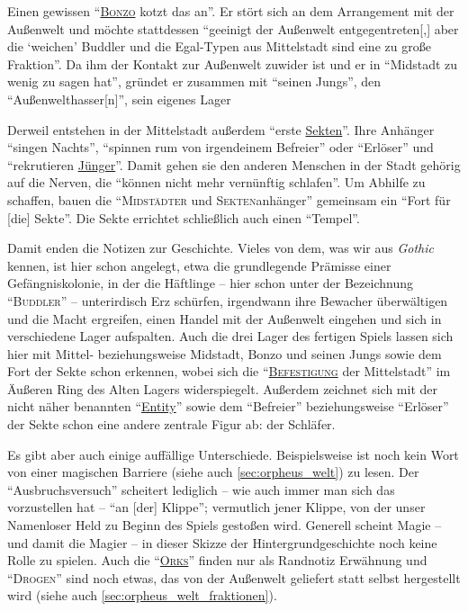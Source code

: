 \documentclass[a5paper,pagesize,numbers=noenddot]{scrbook}
\begin{document}
Einen gewissen \enquote{\textsc{\uline{Bonzo}} kotzt das an}.
Er stört sich an dem Arrangement mit der Außenwelt und möchte stattdessen \enquote{geeinigt der Außenwelt entgegentreten[,] aber die \enquote{weichen} Buddler und die Egal-Typen aus Mittelstadt sind eine zu große Fraktion}.
Da ihm der Kontakt zur Außenwelt zuwider ist und er in \enquote{Midstadt zu wenig zu sagen hat}, gründet er zusammen mit \enquote{seinen Jungs}, den \enquote{Außenwelthasser[n]}, sein eigenes Lager

Derweil entstehen in der Mittelstadt außerdem \enquote{erste \uline{Sekten}}.
Ihre Anhänger \enquote{singen Nachts}, \enquote{spinnen rum von irgendeinem Befreier} oder \enquote{Erlöser} und \enquote{rekrutieren \uline{Jünger}}.
Damit gehen sie den anderen Menschen in der Stadt gehörig auf die Nerven, die \enquote{können nicht mehr vernünftig schlafen}.
Um Abhilfe zu schaffen, bauen die \enquote{\textsc{Midstädter} und \textsc{Sekten}anhänger} gemeinsam ein \enquote{Fort für [die] Sekte}.
Die Sekte errichtet schließlich auch einen \enquote{Tempel}.

Damit enden die Notizen zur Geschichte.
Vieles von dem, was wir aus \textit{Gothic} kennen, ist hier schon angelegt, etwa die grundlegende Prämisse einer Gefängniskolonie, in der die Häftlinge -- hier schon unter der Bezeichnung \enquote{\textsc{Buddler}} -- unterirdisch Erz schürfen, irgendwann ihre Bewacher überwältigen und die Macht ergreifen, einen Handel mit der Außenwelt eingehen und sich in verschiedene Lager aufspalten.
Auch die drei Lager des fertigen Spiels lassen sich hier mit Mittel- beziehungsweise Midstadt, Bonzo und seinen Jungs sowie dem Fort der Sekte schon erkennen, wobei sich die \enquote{\textsc{\uline{Befestigung}} der Mittelstadt} im Äußeren Ring des Alten Lagers widerspiegelt.
Außerdem zeichnet sich mit der nicht näher benannten \enquote{\uline{Entity}} sowie dem \enquote{Befreier} beziehungsweise \enquote{Erlöser} der Sekte schon eine andere zentrale Figur ab: der Schläfer.

Es gibt aber auch einige auffällige Unterschiede.
Beispielsweise ist noch kein Wort von einer magischen Barriere (siehe auch \autoref{sec:orpheus_welt}) zu lesen.
Der \enquote{Ausbruchsversuch} scheitert lediglich -- wie auch immer man sich das vorzustellen hat -- \enquote{an [der] Klippe}; vermutlich jener Klippe, von der unser Namenloser Held zu Beginn des Spiels gestoßen wird.
Generell scheint Magie -- und damit die Magier -- in dieser Skizze der Hintergrundgeschichte noch keine Rolle zu spielen.
Auch die \enquote{\textsc{\uline{Orks}}} finden nur als Randnotiz Erwähnung und \enquote{\textsc{Drogen}} sind noch etwas, das von der Außenwelt geliefert statt selbst hergestellt wird (siehe auch \autoref{sec:orpheus_welt_fraktionen}).
\end{document}
